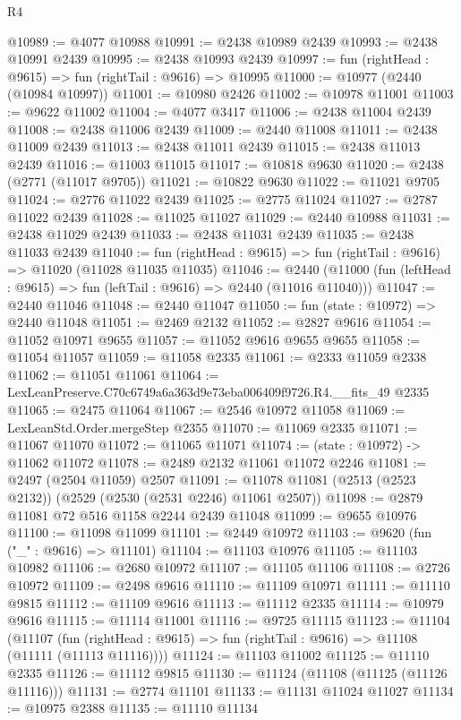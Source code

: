 \begin{lexlean}{R4}
\begin{coremodule}
@10989 := @4077 @10988
@10991 := @2438 @10989 @2439
@10993 := @2438 @10991 @2439
@10995 := @2438 @10993 @2439
@10997 := fun (rightHead : @9615) => fun (rightTail : @9616) => @10995
@11000 := @10977 (@2440 (@10984 @10997))
@11001 := @10980 @2426
@11002 := @10978 @11001
@11003 := @9622 @11002
@11004 := @4077 @3417
@11006 := @2438 @11004 @2439
@11008 := @2438 @11006 @2439
@11009 := @2440 @11008
@11011 := @2438 @11009 @2439
@11013 := @2438 @11011 @2439
@11015 := @2438 @11013 @2439
@11016 := @11003 @11015
@11017 := @10818 @9630
@11020 := @2438 (@2771 (@11017 @9705))
@11021 := @10822 @9630
@11022 := @11021 @9705
@11024 := @2776 @11022 @2439
@11025 := @2775 @11024
@11027 := @2787 @11022 @2439
@11028 := @11025 @11027
@11029 := @2440 @10988
@11031 := @2438 @11029 @2439
@11033 := @2438 @11031 @2439
@11035 := @2438 @11033 @2439
@11040 := fun (rightHead : @9615) => fun (rightTail : @9616) => @11020 (@11028 @11035 @11035)
@11046 := @2440 (@11000 (fun (leftHead : @9615) => fun (leftTail : @9616) => @2440 (@11016 @11040)))
@11047 := @2440 @11046
@11048 := @2440 @11047
@11050 := fun (state : @10972) => @2440 @11048
@11051 := @2469 @2132
@11052 := @2827 @9616
@11054 := @11052 @10971 @9655
@11057 := @11052 @9616 @9655 @9655
@11058 := @11054 @11057
@11059 := @11058 @2335
@11061 := @2333 @11059 @2338
@11062 := @11051 @11061
@11064 := LexLeanPreserve.C70c6749a6a363d9e73eba006409f9726.R4.__fits_49 @2335
@11065 := @2475 @11064
@11067 := @2546 @10972 @11058
@11069 := LexLeanStd.Order.mergeStep @2355
@11070 := @11069 @2335
@11071 := @11067 @11070
@11072 := @11065 @11071
@11074 := (state : @10972) -> @11062 @11072
@11078 := @2489 @2132 @11061 @11072 @2246
@11081 := @2497 (@2504 @11059) @2507
@11091 := @11078 @11081 (@2513 (@2523 @2132)) (@2529 (@2530 (@2531 @2246) @11061 @2507))
@11098 := @2879 @11081 @72 @516 @1158 @2244 @2439 @11048
@11099 := @9655 @10976
@11100 := @11098 @11099
@11101 := @2449 @10972
@11103 := @9620 (fun ("_" : @9616) => @11101)
@11104 := @11103 @10976
@11105 := @11103 @10982
@11106 := @2680 @10972
@11107 := @11105 @11106
@11108 := @2726 @10972
@11109 := @2498 @9616
@11110 := @11109 @10971
@11111 := @11110 @9815
@11112 := @11109 @9616
@11113 := @11112 @2335
@11114 := @10979 @9616
@11115 := @11114 @11001
@11116 := @9725 @11115
@11123 := @11104
    (@11107 (fun (rightHead : @9615) => fun (rightTail : @9616) => @11108 (@11111 (@11113 @11116))))
@11124 := @11103 @11002
@11125 := @11110 @2335
@11126 := @11112 @9815
@11130 := @11124 (@11108 (@11125 (@11126 @11116)))
@11131 := @2774 @11101
@11133 := @11131 @11024 @11027
@11134 := @10975 @2388
@11135 := @11110 @11134

\end{coremodule}
\end{lexlean}
